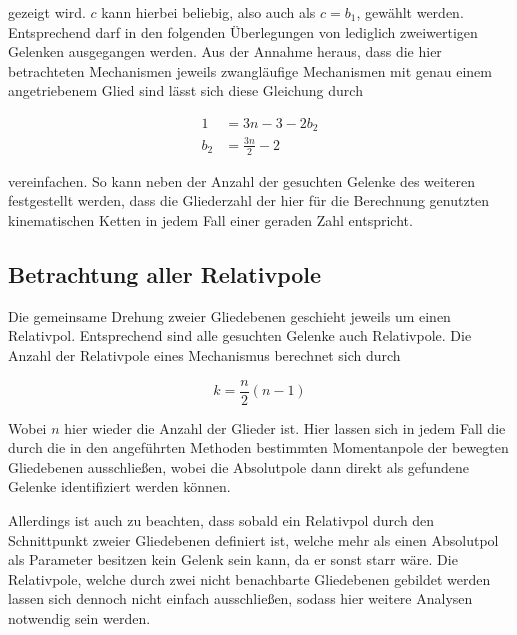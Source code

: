 gezeigt wird.
$c$ kann hierbei beliebig, also auch als $c = b_1$, gewählt werden.
Entsprechend darf in den folgenden Überlegungen von lediglich zweiwertigen Gelenken ausgegangen werden.
Aus der Annahme heraus, dass die hier betrachteten Mechanismen jeweils zwangläufige Mechanismen mit genau einem angetriebenem Glied sind lässt sich diese Gleichung durch

\begin{equation}
    \begin{split}
        1 &= 3n - 3 - 2b_2 \\
        b_2 &= \frac{3n}{2} - 2
    \end{split}
\end{equation}

vereinfachen.
So kann neben der Anzahl der gesuchten Gelenke des weiteren festgestellt werden, dass die Gliederzahl der hier für die Berechnung genutzten kinematischen Ketten in jedem Fall einer geraden Zahl entspricht.


\subsection{Betrachtung aller Relativpole}

Die gemeinsame Drehung zweier Gliedebenen geschieht jeweils um einen Relativpol.
Entsprechend sind alle gesuchten Gelenke auch Relativpole.
Die Anzahl der Relativpole eines Mechanismus berechnet sich durch~\cite{Goessner2016}

\begin{equation}
    k = \frac{n}{2}(n-1)
    \label{eq:anzahl_pole}
\end{equation}

Wobei $n$ hier wieder die Anzahl der Glieder ist.
Hier lassen sich in jedem Fall die durch die in den angeführten Methoden bestimmten Momentanpole der bewegten Gliedebenen ausschlie{\ss}en, wobei die Absolutpole dann direkt als gefundene Gelenke identifiziert werden können.

Allerdings ist auch zu beachten, dass sobald ein Relativpol durch den Schnittpunkt zweier Gliedebenen definiert ist, welche mehr als einen Absolutpol als Parameter besitzen kein Gelenk sein kann, da er sonst starr wäre.
Die Relativpole, welche durch zwei nicht benachbarte Gliedebenen gebildet werden lassen sich dennoch nicht einfach ausschlie{\ss}en, sodass hier weitere Analysen notwendig sein werden.

